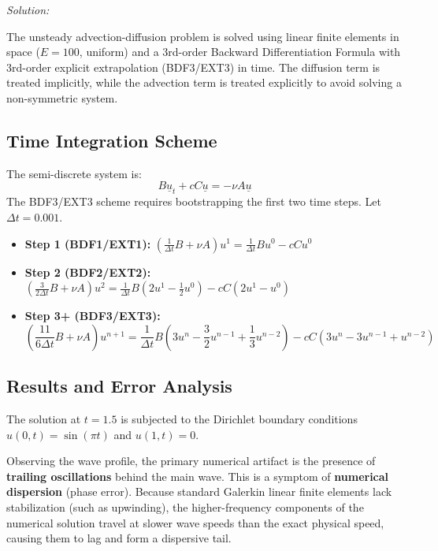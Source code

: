 \documentclass[11pt]{article}
\newenvironment{solution}
    {\textit{Solution:}}
    {}
\begin{document}
\begin{solution}

The unsteady advection-diffusion problem is solved using linear finite elements in space ($E=100$, uniform) and a 3rd-order Backward Differentiation Formula with 3rd-order explicit extrapolation (BDF3/EXT3) in time. The diffusion term is treated implicitly, while the advection term is treated explicitly to avoid solving a non-symmetric system.

\subsection*{Time Integration Scheme}
The semi-discrete system is:
\begin{equation}
    B\underline{u}_t + cC\underline{u} = -\nu A\underline{u}
\end{equation}
The BDF3/EXT3 scheme requires bootstrapping the first two time steps. Let $\Delta t = 0.001$.
\begin{itemize}
    \item \textbf{Step 1 (BDF1/EXT1):} $\left(\frac{1}{\Delta t} B + \nu A\right) u^1 = \frac{1}{\Delta t} B u^0 - c C u^0$
    \item \textbf{Step 2 (BDF2/EXT2):} $\left(\frac{3}{2\Delta t} B + \nu A\right) u^2 = \frac{1}{\Delta t} B \left(2 u^1 - \frac{1}{2} u^0\right) - c C (2 u^1 - u^0)$
    \item \textbf{Step 3+ (BDF3/EXT3):}
    \begin{equation*}
        \left(\frac{11}{6\Delta t} B + \nu A\right) u^{n+1} = \frac{1}{\Delta t} B \left(3 u^n - \frac{3}{2} u^{n-1} + \frac{1}{3} u^{n-2}\right) - c C \left(3 u^n - 3 u^{n-1} + u^{n-2}\right)
    \end{equation*}
\end{itemize}

\subsection*{Results and Error Analysis}
The solution at $t=1.5$ is subjected to the Dirichlet boundary conditions $u(0,t) = \sin(\pi t)$ and $u(1,t) = 0$.

Observing the wave profile, the primary numerical artifact is the presence of \textbf{trailing oscillations} behind the main wave. This is a symptom of \textbf{numerical dispersion} (phase error). Because standard Galerkin linear finite elements lack stabilization (such as upwinding), the higher-frequency components of the numerical solution travel at slower wave speeds than the exact physical speed, causing them to lag and form a dispersive tail.


\end{solution}
\end{document}
